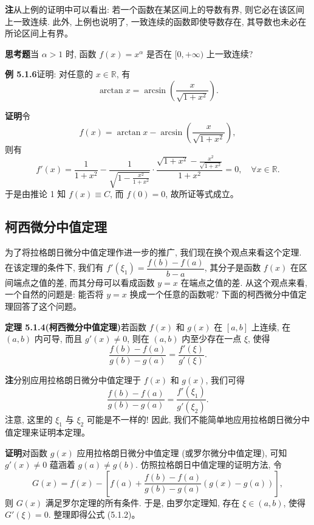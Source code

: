 \documentclass[UTF8,12pt,a4paper,fontset=fandol]{ctexart}
\begin{document}
\noindent\textbf{注}\quad 从上例的证明中可以看出: 若一个函数在某区间上的导数有界, 则它必在该区间上一致连续. 此外, 上例也说明了, 一致连续的函数即使导数存在, 其导数也未必在所论区间上有界。

\noindent\textbf{思考题}\quad 当 $\alpha>1$ 时, 函数 $f(x)=x^\alpha$ 是否在 $[0,+\infty)$ 上一致连续?

\noindent\textbf{例 5.1.6}\quad 证明: 对任意的 $x\in\mathbb{R}$, 有
\[
  \arctan x=\arcsin\left(\frac{x}{\sqrt{1+x^2}}\right).
\]

\noindent\textbf{证明}\quad 令
\[
  f(x)=\arctan x-\arcsin\left(\frac{x}{\sqrt{1+x^2}}\right),
\]
则有
\[
  f'(x)
  =
  \frac1{1+x^2}
  -
  \frac1{\sqrt{1-\frac{x^2}{1+x^2}}}
  \cdot
  \frac{\sqrt{1+x^2}-\frac{x^2}{\sqrt{1+x^2}}}{1+x^2}
  =
  0,\quad \forall x\in\mathbb{R}.
\]
于是由推论 1 知 $f(x)\equiv C$, 而 $f(0)=0$, 故所证等式成立。

\subsection{柯西微分中值定理}

为了将拉格朗日微分中值定理作进一步的推广, 我们现在换个观点来看这个定理. 在该定理的条件下, 我们有 $f'(\xi_1)=\dfrac{f(b)-f(a)}{b-a}$, 其分子是函数 $f(x)$ 在区间端点之值的差, 而其分母可以看成函数 $y=x$ 在端点之值的差. 从这个观点来看, 一个自然的问题是: 能否将 $y=x$ 换成一个任意的函数呢? 下面的柯西微分中值定理回答了这个问题。

\noindent\textbf{定理 5.1.4(柯西微分中值定理)}\quad 若函数 $f(x)$ 和 $g(x)$ 在 $[a,b]$ 上连续, 在 $(a,b)$ 内可导, 而且 $g'(x)\ne0$, 则在 $(a,b)$ 内至少存在一点 $\xi$, 使得
\begin{equation}
  \frac{f(b)-f(a)}{g(b)-g(a)}=\frac{f'(\xi)}{g'(\xi)}.
  \tag{5.1.2}
\end{equation}

\noindent\textbf{注}\quad 分别应用拉格朗日微分中值定理于 $f(x)$ 和 $g(x)$, 我们可得
\[
  \frac{f(b)-f(a)}{g(b)-g(a)}=\frac{f'(\xi_1)}{g'(\xi_2)}.
\]
注意, 这里的 $\xi_1$ 与 $\xi_2$ 可能是不一样的! 因此, 我们不能简单地应用拉格朗日微分中值定理来证明本定理。

\noindent\textbf{证明}\quad 对函数 $g(x)$ 应用拉格朗日微分中值定理 (或罗尔微分中值定理), 可知 $g'(x)\ne0$ 蕴涵着 $g(a)\ne g(b)$. 仿照拉格朗日中值定理的证明方法, 令
\[
  G(x)=f(x)-\left[f(a)+\frac{f(b)-f(a)}{g(b)-g(a)}(g(x)-g(a))\right],
\]
则 $G(x)$ 满足罗尔定理的所有条件. 于是, 由罗尔定理知, 存在 $\xi\in(a,b)$, 使得 $G'(\xi)=0$. 整理即得公式 (5.1.2)。
\end{document}

